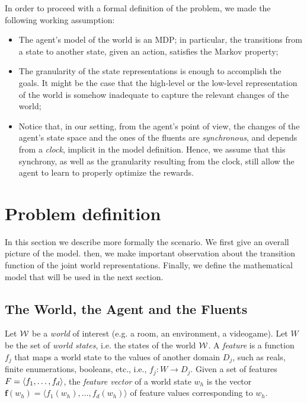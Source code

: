In order to proceed with a formal definition of the problem, we made the following working assumption:
\begin{itemize}
	\item The agent's model of the world is an MDP; in particular, the transitions from a state to another state, given an action, satisfies the Markov property;
	\item The granularity of the state representations is enough to accomplish the \LLf goals. It might be the case that the high-level or the low-level representation of the world is somehow inadequate to capture the relevant changes of the world;
	\item Notice that, in our setting, from the agent's point of view, the changes of the agent's state space and the ones of the fluents are \emph{synchronous}, and depends from a \emph{clock}, implicit in the model definition. Hence, we assume that this synchrony, as well as the granularity resulting from the clock, still allow the agent to learn to properly optimize the rewards.
\end{itemize}


\section{Problem definition}
\label{sect:problem-definition}
In this section we describe more formally the scenario. We first give an overall picture of the model. then, we make important observation about the transition function of the joint world representations. Finally, we define the mathematical model that will be used in the next section.
\subsection{The World, the Agent and the Fluents}
Let $\mathcal{W}$ be a \emph{world} of interest (e.g. a room, an environment, a videogame). Let $W$ be the set of \emph{world states}, i.e. the states of the world $\mathcal{W}$. 
A \emph{feature} is a function $f_j$ that maps a world state to the
values of another domain $D_j$, such as reals, finite enumerations,
booleans, etc., i.e., $f_j : W \rightarrow D_j$.
Given a set of features $F = \langle f_1, \dots, f_d \rangle$, the \emph{feature vector} of a world state $w_h$ is the vector
$\mathbf{f}(w_h) = \langle f_1(w_h), \ldots, f_d(w_h) \rangle$ of
feature values corresponding to $w_h$.

